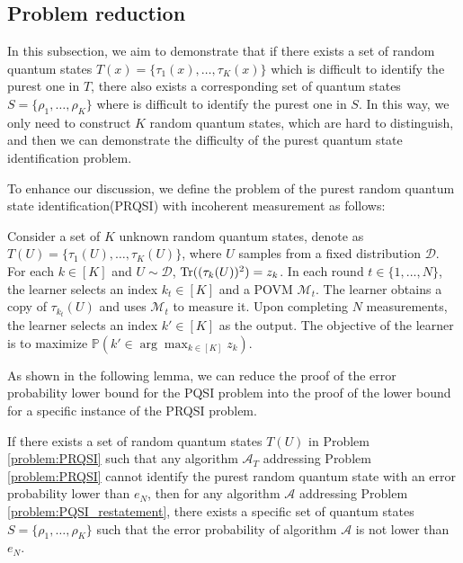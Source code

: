 \subsection{Problem reduction}

In this subsection, we aim to demonstrate that if there exists a set of random quantum states $ T(x) = \{\tau_1(x), \ldots, \tau_K(x)\} $ which is difficult to identify the purest one in $T$, there also exists a corresponding set of quantum states $ S = \{\rho_1, \ldots, \rho_K\} $ where is difficult to identify the purest one in $S$. In this way, we only need to construct $ K $  random quantum states, which are hard to distinguish, and then we can demonstrate the difficulty of the purest quantum state identification problem.




To enhance our discussion, we define the problem of the purest random quantum state identification(PRQSI) with incoherent measurement as follows:

\begin{problem} \label{problem:PRQSI}  Consider a set of $K$ unknown random quantum states, denote as $ T(U) = \{ \tau_1(U), \ldots, \tau_K(U) \} $, where $U$ samples from a fixed distribution $\mathcal{D}$. For each $ k \in [K] $ and $U \sim \mathcal{D}$, $\mathrm{Tr} ((\tau_k(U))^2) = z_k$. In each round $t \in\{1,...,N\}$, the learner selects an index $k_t \in [K]$ and a POVM $\mathcal{M}_t$. The learner obtains a copy of $\tau_{k_t}(U)$ and uses $\mathcal{M}_t$ to measure it. Upon completing $ N $ measurements, the learner selects an index $ k' \in [K] $ as the output. The objective of the learner is to maximize $ \mathbb{P}(k' \in \arg\max_{k \in [K]} z_k) $.
\end{problem} 

As shown in the following lemma, we can reduce the proof of the error probability lower bound for the PQSI problem into the proof of the lower bound for a specific instance of the PRQSI problem.

\begin{lemma}%
    \label{lem:problem transformation}
    If there exists a set of random quantum states $T(U)$ in Problem \ref{problem:PRQSI} such that any algorithm $\mathcal{A}_T$ addressing Problem \ref{problem:PRQSI} cannot identify the purest random quantum state with an error probability lower than $ e_N $, then for any algorithm $ \mathcal{A} $ addressing Problem \ref{problem:PQSI_restatement}, there exists a specific set of quantum states $S = \{\rho_1, \ldots, \rho_K\}$ such that the error probability of algorithm $ \mathcal{A} $ is not lower than $ e_N $.
\end{lemma}

